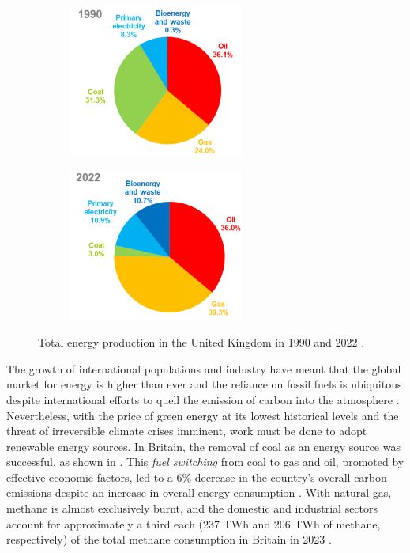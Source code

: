 \begin{figure}[t]
\centering
    \begin{subfigure}{0.40\textwidth}
    \centering
    \includegraphics[height=5cm]{assets/graphs/energy-consumption_1990.png}
    \end{subfigure}
    \begin{subfigure}{0.40\textwidth}
    \centering
    \includegraphics[height=5cm]{assets/graphs/energy-consumption_2022.png}
    \end{subfigure}
\caption{Total energy production in the United Kingdom in 1990 and 2022 \cite{departmentforenergysecurityandnetzero2023UKEnergyBrief}.}
\label{fig:fuel-consump}
\end{figure}

The growth of international populations and industry have meant that the global market for energy is higher than ever \cite{newell2019GlobalEnergyOutlook} and the reliance on fossil fuels is ubiquitous despite international efforts to quell the emission of carbon into the atmosphere \cite{unitednations2015ParisAgreementUNFCCC}. Nevertheless, with the price of green energy at its lowest historical levels \cite{internationalrenewableenergyagency2022RenewablePowerGeneration} and the threat of irreversible climate crises imminent, work must be done to adopt renewable energy sources. In Britain, the removal of coal as an energy source was successful, as shown in . This \emph{fuel switching} from coal to gas and oil, promoted by effective economic factors, led to a 6\% decrease in the country's overall carbon emissions despite an increase in overall energy consumption \cite{wilson2018RapidFuelSwitching}. With natural gas, methane is almost exclusively burnt, and the domestic and industrial sectors account for approximately a third each (237 TWh and 206 TWh of methane, respectively) of the total methane consumption in Britain in 2023 \cite{departmentforenergysecurityandnetzero2023HistoricalGasData}.

